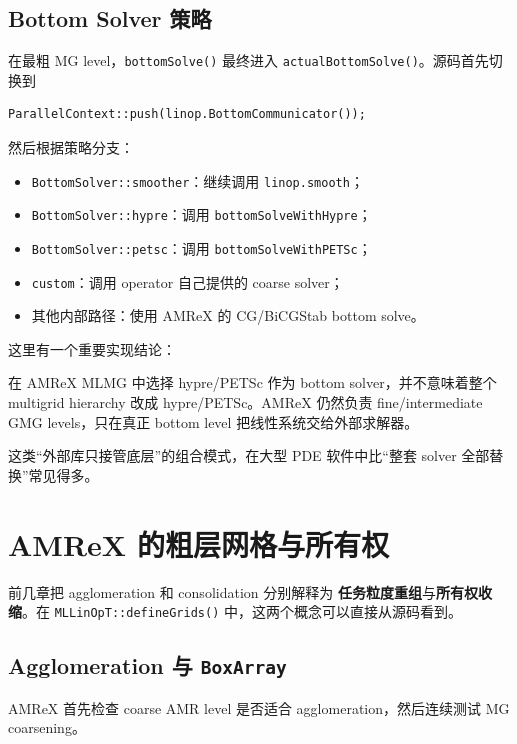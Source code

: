 \subsection{Bottom Solver 策略}

在最粗 MG level，\texttt{bottomSolve()} 最终进入
\texttt{actualBottomSolve()}。源码首先切换到

\begin{verbatim}
ParallelContext::push(linop.BottomCommunicator());
\end{verbatim}

然后根据策略分支：

\begin{itemize}
\item \texttt{BottomSolver::smoother}：继续调用 \texttt{linop.smooth}；
\item \texttt{BottomSolver::hypre}：调用 \texttt{bottomSolveWithHypre}；
\item \texttt{BottomSolver::petsc}：调用 \texttt{bottomSolveWithPETSc}；
\item \texttt{custom}：调用 operator 自己提供的 coarse solver；
\item 其他内部路径：使用 AMReX 的 CG/BiCGStab bottom solve。
\end{itemize}

这里有一个重要实现结论：

\begin{keybox}
在 AMReX MLMG 中选择 hypre/PETSc 作为 bottom solver，并不意味着整个 multigrid hierarchy 改成 hypre/PETSc。AMReX 仍然负责 fine/intermediate GMG levels，只在真正 bottom level 把线性系统交给外部求解器。
\end{keybox}

这类“外部库只接管底层”的组合模式，在大型 PDE 软件中比“整套 solver 全部替换”常见得多。

\section{AMReX 的粗层网格与所有权}

前几章把 agglomeration 和 consolidation 分别解释为
\textbf{任务粒度重组}与\textbf{所有权收缩}。在
\texttt{MLLinOpT::defineGrids()} 中，这两个概念可以直接从源码看到。

\subsection{Agglomeration 与 \texttt{BoxArray}}

AMReX 首先检查 coarse AMR level 是否适合 agglomeration，然后连续测试 MG coarsening。

